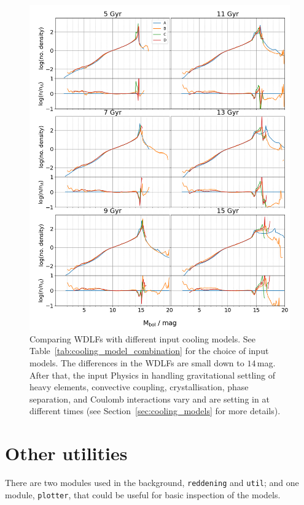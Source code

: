 \documentclass[fleqn,usenatbib]{rasti}
\begin{document}
\begin{figure}
    \centering
    \includegraphics[width=\textwidth]{fig_11_wdlf_compare_da_cooling_models.png}
    \caption{Comparing WDLFs with different input cooling models. See
    Table~\ref{tab:cooling_model_combination} for the choice of input models.
    The differences in the WDLFs are small down to $14$\,mag. After that, the
    input Physics in handling gravitational settling of heavy elements,
    convective coupling, crystallisation, phase separation, and Coulomb
    interactions vary and are setting in at different times (see
    Section~\ref{sec:cooling_models} for more details).
    }
    \label{fig:wdlf_compare_da_cooling_models}
\end{figure}


\section{Other utilities}
\label{sec:utility}
There are two modules used in the background, \texttt{reddening} and
\texttt{util}; and one module, \texttt{plotter}, that could be useful for
basic inspection of the models. 
\end{document}
